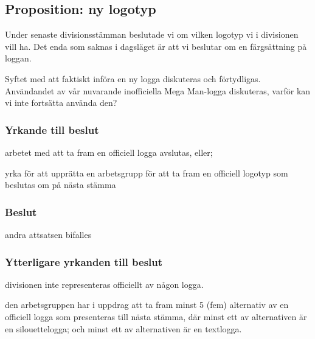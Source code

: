 \documentclass[protokoll]{dvd}
\begin{document}
\subsection{Proposition: ny logotyp}

Under senaste divisionsstämman beslutade vi om vilken logotyp vi i divisionen vill ha.
Det enda som saknas i dagsläget är att vi beslutar om en färgsättning på loggan.

Syftet med att faktiskt införa en ny logga diskuteras och förtydligas.
Användandet av vår nuvarande inofficiella Mega Man-logga diskuteras, varför kan vi inte fortsätta använda den?

    \subsubsection*{Yrkande till beslut}

        \begin{attsatser}

            \item arbetet med att ta fram en officiell logga avslutas, eller;
            \item yrka för att upprätta en arbetsgrupp för att ta fram en officiell logotyp som beslutas om på nästa stämma

        \end{attsatser}

    \subsubsection*{Beslut}

    \begin{attsatser}
        \item andra attsatsen bifalles
    \end{attsatser}

\newpage

    \subsubsection*{Ytterligare yrkanden till beslut}
        \begin{attsatser}
                \item divisionen inte representeras officiellt av någon logga.
                \item den arbetsgruppen har i uppdrag att ta fram minst 5 (fem)
                      alternativ av en officiell logga som presenteras till nästa stämma,
                      där minst ett av alternativen är en silouettelogga; och minst ett av alternativen är en textlogga.
        \end{attsatser}
\end{document}
